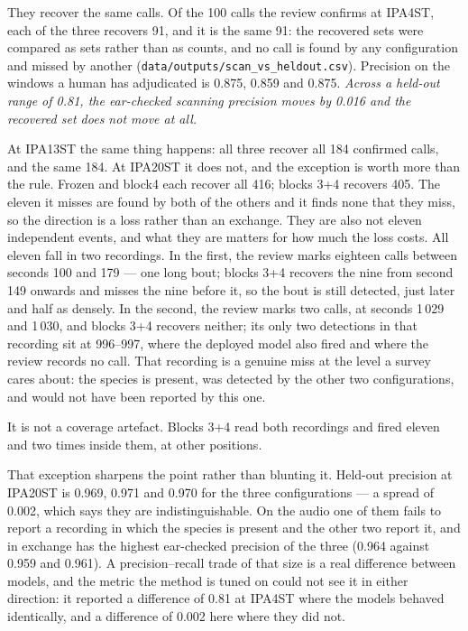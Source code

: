 \documentclass[review,3p,times]{elsarticle}
\begin{document}
They recover the same calls. Of the 100 calls the review confirms at IPA4ST,
each of the three recovers 91, and it is the same 91: the recovered sets were
compared as sets rather than as counts, and no call is found by any
configuration and missed by another
(\texttt{data/outputs/scan\_vs\_heldout.csv}). Precision on the windows a human
has adjudicated is 0.875, 0.859 and 0.875. \emph{Across a held-out range of
0.81, the ear-checked scanning precision moves by 0.016 and the recovered set
does not move at all.}

At IPA13ST the same thing happens: all three recover all 184 confirmed calls,
and the same 184. At IPA20ST it does not, and the exception is worth more than
the rule. Frozen and block4 each recover all 416; blocks 3+4 recovers 405. The
eleven it misses are found by both of the others and it finds none that they
miss, so the direction is a loss rather than an exchange. They are also not
eleven independent events, and what they are matters for how much the loss
costs. All eleven fall in two recordings. In the first, the review marks
eighteen calls between seconds 100 and 179 --- one long bout; blocks 3+4
recovers the nine from second 149 onwards and misses the nine before it, so the
bout is still detected, just later and half as densely. In the second, the
review marks two calls, at seconds 1\,029 and 1\,030, and blocks 3+4 recovers
neither; its only two detections in that recording sit at 996--997, where the
deployed model also fired and where the review records no call. That recording
is a genuine miss at the level a survey cares about: the species is present, was
detected by the other two configurations, and would not have been reported by
this one.

It is not a coverage artefact. Blocks 3+4 read both recordings and fired eleven
and two times inside them, at other positions.

That exception sharpens the point rather than blunting it. Held-out precision at
IPA20ST is 0.969, 0.971 and 0.970 for the three configurations --- a spread of
0.002, which says they are indistinguishable. On the audio one of them fails to
report a recording in which the species is present and the other two report it,
and in exchange has the highest ear-checked precision of the three (0.964
against 0.959 and 0.961). A precision--recall trade of that size is a real
difference between models, and
the metric the method is tuned on could not see it in either direction: it
reported a difference of 0.81 at IPA4ST where the models behaved identically,
and a difference of 0.002 here where they did not.
\end{document}
